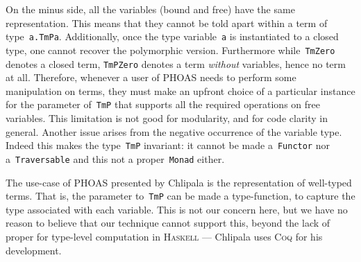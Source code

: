 \documentclass[9pt,preprint,authoryear]{sigplanconf}
\begin{document}
%
On the minus side, all the variables (bound and free) have the
    same representation. This means that they cannot be told apart
    within a term of type{~}\textcolor[cmyk]{0,0.65,0.99,0}{\texttt{\makebox[1.22ex][c]{$ \forall $}}}\textcolor[rgb]{0,0,0.80}{\texttt{\mbox{\hspace{0.50em}}}}\textcolor[rgb]{0,0,0.80}{\texttt{a}}\textcolor[cmyk]{0,0.65,0.99,0}{\texttt{.}}\textcolor[rgb]{0,0,0.80}{\texttt{\mbox{\hspace{0.50em}}}}\textcolor[rgb]{0,0,0.80}{\texttt{TmP}}\textcolor[rgb]{0,0,0.80}{\texttt{\mbox{\hspace{0.50em}}}}\textcolor[rgb]{0,0,0.80}{\texttt{a}}. Additionally, once the type
    variable{~}\textcolor[rgb]{0,0,0.80}{\texttt{a}} is instantiated to a closed type, one cannot recover
    the polymorphic version. Furthermore while{~}\textcolor[rgb]{0,0,0.80}{\texttt{Tm}}\textcolor[rgb]{0,0,0.80}{\texttt{\mbox{\hspace{0.50em}}}}\textcolor[rgb]{0,0,0.80}{\texttt{Zero}} denotes a
    closed term, \textcolor[rgb]{0,0,0.80}{\texttt{TmP}}\textcolor[rgb]{0,0,0.80}{\texttt{\mbox{\hspace{0.50em}}}}\textcolor[rgb]{0,0,0.80}{\texttt{Zero}} denotes a term \emph{without} variables, hence no
    term at all. Therefore, whenever a user of PHOAS needs to perform
    some manipulation on terms, they must make an upfront choice of a
    particular instance for the parameter of{~}\textcolor[rgb]{0,0,0.80}{\texttt{TmP}} that supports
    all the required operations on free variables. This limitation is
    not good for modularity, and for code clarity in general. Another issue
    arises from the negative occurrence of the variable type. Indeed this
    makes the type{~}\textcolor[rgb]{0,0,0.80}{\texttt{TmP}} invariant{:} it cannot be made a{~}\textcolor[rgb]{0,0,0.80}{\texttt{Functor}}    nor a{~}\textcolor[rgb]{0,0,0.80}{\texttt{Traversable}} and this not a proper{~}\textcolor[rgb]{0,0,0.80}{\texttt{Monad}} either.%


%
The use-case of PHOAS presented by Chlipala is the representation
    of well-typed terms. That is, the parameter to{~}\textcolor[rgb]{0,0,0.80}{\texttt{TmP}} can be made
    a type-function, to capture the type associated with each variable.
    This is not our concern here, but we have no reason to believe that
    our technique cannot support this, beyond the lack of proper for
    type-level computation in \textsc{Haskell} --- Chlipala uses \textsc{Coq} for his
    development.%
\end{document}
